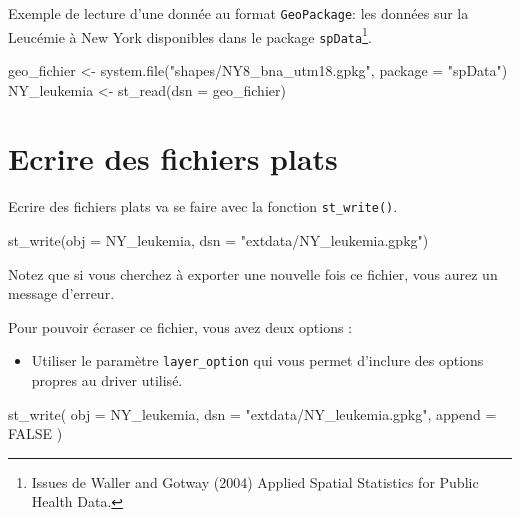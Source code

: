 \documentclass[
]{book}
\newenvironment{Shaded}{\begin{snugshade}}{\end{snugshade}}
\newcommand{\AttributeTok}[1]{\textcolor[rgb]{0.77,0.63,0.00}{#1}}
\newcommand{\ConstantTok}[1]{\textcolor[rgb]{0.00,0.00,0.00}{#1}}
\newcommand{\FunctionTok}[1]{\textcolor[rgb]{0.00,0.00,0.00}{#1}}
\newcommand{\NormalTok}[1]{#1}
\newcommand{\OtherTok}[1]{\textcolor[rgb]{0.56,0.35,0.01}{#1}}
\newcommand{\StringTok}[1]{\textcolor[rgb]{0.31,0.60,0.02}{#1}}
\providecommand{\tightlist}{%
  \setlength{\itemsep}{0pt}\setlength{\parskip}{0pt}}
\begin{document}
Exemple de lecture d'une donnée au format \texttt{GeoPackage}: les données sur la Leucémie à New York disponibles dans le package \texttt{spData}\footnote{Issues de Waller and Gotway (2004) Applied Spatial Statistics for Public Health Data.}.

\begin{Shaded}
\begin{Highlighting}[]
\NormalTok{geo\_fichier }\OtherTok{\textless{}{-}} \FunctionTok{system.file}\NormalTok{(}\StringTok{"shapes/NY8\_bna\_utm18.gpkg"}\NormalTok{, }\AttributeTok{package =} \StringTok{"spData"}\NormalTok{)}
\NormalTok{NY\_leukemia }\OtherTok{\textless{}{-}} \FunctionTok{st\_read}\NormalTok{(}\AttributeTok{dsn =}\NormalTok{ geo\_fichier)}
\end{Highlighting}
\end{Shaded}

\hypertarget{ecrire-des-fichiers-plats}{%
\section{Ecrire des fichiers plats}\label{ecrire-des-fichiers-plats}}

Ecrire des fichiers plats va se faire avec la fonction \texttt{st\_write()}.

\begin{Shaded}
\begin{Highlighting}[]
\FunctionTok{st\_write}\NormalTok{(}\AttributeTok{obj =}\NormalTok{ NY\_leukemia, }\AttributeTok{dsn =} \StringTok{"extdata/NY\_leukemia.gpkg"}\NormalTok{)}
\end{Highlighting}
\end{Shaded}

Notez que si vous cherchez à exporter une nouvelle fois ce fichier, vous aurez un message d'erreur.

Pour pouvoir écraser ce fichier, vous avez deux options :

\begin{itemize}
\tightlist
\item
  Utiliser le paramètre \texttt{layer\_option} qui vous permet d'inclure des options propres au driver utilisé.
\end{itemize}

\begin{Shaded}
\begin{Highlighting}[]
\FunctionTok{st\_write}\NormalTok{(}
  \AttributeTok{obj =}\NormalTok{ NY\_leukemia,}
  \AttributeTok{dsn =} \StringTok{"extdata/NY\_leukemia.gpkg"}\NormalTok{,}
  \AttributeTok{append =} \ConstantTok{FALSE}
\NormalTok{)}
\end{Highlighting}
\end{Shaded}
\end{document}
